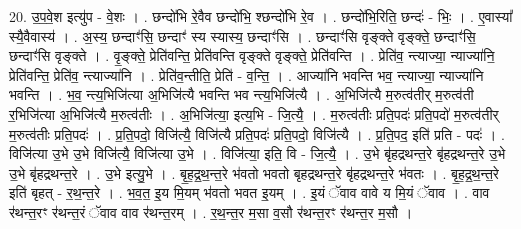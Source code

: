 \documentclass[17pt]{extarticle}
\begin{document}
20. उ॒प॒वे॒श इत्यु॑प - वे॒शः । . छन्दो॑भि रे॒वैव छन्दो॑भि॒ श्छन्दो॑भि रे॒व । . छन्दो॑भि॒रिति॒ छन्दः॑ - भिः॒ । . ए॒वास्या᳚ स्यै॒वैवास्य॑ । . अ॒स्य॒ छन्दाꣳ॑सि॒ छन्दाꣳ॑ स्य स्यास्य॒ छन्दाꣳ॑सि । . छन्दाꣳ॑सि वृङ्क्ते वृङ्क्ते॒ छन्दाꣳ॑सि॒ छन्दाꣳ॑सि वृङ्क्ते । . वृ॒ङ्क्ते॒ प्रेति॑वन्ति॒ प्रेति॑वन्ति वृङ्क्ते वृङ्क्ते॒ प्रेति॑वन्ति । . प्रेति॑व॒ न्त्याज्या॒ न्याज्या॑नि॒ प्रेति॑वन्ति॒ प्रेति॑व॒ न्त्याज्या॑नि । . प्रेति॑व॒न्तीति॒ प्रेति॑ - व॒न्ति॒ । . आज्या॑नि भवन्ति भव॒ न्त्याज्या॒ न्याज्या॑नि भवन्ति । . भ॒व॒ न्त्य॒भिजि॑त्या अ॒भिजि॑त्यै भवन्ति भव न्त्य॒भिजि॑त्यै । . अ॒भिजि॑त्यै म॒रुत्व॑तीर् म॒रुत्व॑ती र॒भिजि॑त्या अ॒भिजि॑त्यै म॒रुत्व॑तीः । . अ॒भिजि॑त्या॒ इत्य॒भि - जि॒त्यै॒ । . म॒रुत्व॑तीः प्रति॒पदः॑ प्रति॒पदो॑ म॒रुत्व॑तीर् म॒रुत्व॑तीः प्रति॒पदः॑ । . प्र॒ति॒पदो॒ विजि॑त्यै॒ विजि॑त्यै प्रति॒पदः॑ प्रति॒पदो॒ विजि॑त्यै । . प्र॒ति॒पद॒ इति॑ प्रति - पदः॑ । . विजि॑त्या उ॒भे उ॒भे विजि॑त्यै॒ विजि॑त्या उ॒भे । . विजि॑त्या॒ इति॒ वि - जि॒त्यै॒ । . उ॒भे बृ॑हद्रथन्त॒रे बृ॑हद्रथन्त॒रे उ॒भे उ॒भे बृ॑हद्रथन्त॒रे । . उ॒भे इत्यु॒भे । . बृ॒ह॒द्र॒थ॒न्त॒रे भ॑वतो भवतो बृहद्रथन्त॒रे बृ॑हद्रथन्त॒रे भ॑वतः । . बृ॒ह॒द्र॒थ॒न्त॒रे इति॑ बृहत् - र॒थ॒न्त॒रे । . भ॒व॒त॒ इ॒य मि॒यम् भ॑वतो भवत इ॒यम् । . इ॒यं ॅवाव वावे य मि॒यं ॅवाव । . वाव र॑थन्त॒रꣳ र॑थन्त॒रं ॅवाव वाव र॑थन्त॒रम् । . र॒थ॒न्त॒र म॒सा व॒सौ र॑थन्त॒रꣳ र॑थन्त॒र म॒सौ । \newline
\end{document}
